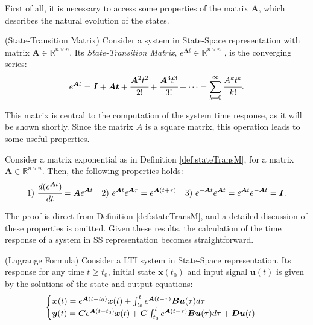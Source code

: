 \documentclass[a4paper,11pt]{book}
\numberwithin{figure}{chapter}
\numberwithin{equation}{chapter}
\numberwithin{table}{chapter}
\newtheorem{theorem}{Theorem}[chapter]
\theoremstyle{definition}
\newtheorem{definition}{Definition}[chapter]
\newcounter{boxed-theorem}
\newenvironment{boxed-theorem}[1]
{\begin{shaded} \begin{theorem}{#1}}
{\end{theorem} \end{shaded}}
\newcounter{boxed-definition}
\newenvironment{boxed-definition}[1]
{\begin{shaded} \begin{definition}{#1}}
{\end{definition} \end{shaded}}
\begin{document}
First of all, it is necessary to access some properties of the matrix $\bm{A}$, which describes the natural evolution of the states. 

\begin{boxed-definition}{(State-Transition Matrix)} \label{def:stateTransM}
    Consider a system in State-Space representation with matrix $\bm{A} \in \mathbb{R}^{n \times n}$. Its \textit{State-Transition Matrix}, $e^{\bm{A} t} \in \mathbb{R}^{n \times n}$ , is the converging series:
\begin{equation}
    e^{\bm{A} t} = \bm{I} + \bm{At} + \cfrac{\bm{A}^2 t^2}{2!} + \cfrac{\bm{A}^3 t^3}{3!} + \cdots = \sum_{k=0}^{\infty} \cfrac{A^k t^k}{k!}
.\end{equation} 
\end{boxed-definition}

This matrix is central to the computation of the system time response, as it will be shown shortly. Since the matrix $A$ is a square matrix, this operation leads to some useful properties.

\begin{boxed-theorem}{} \label{th:stateTransMProp}
    Consider a matrix exponential as in Definition \ref{def:stateTransM}, for a matrix $\bm{A}  \in \mathbb{R}^{n \times n}$. Then, the following properties holds:
\begin{align}
        1)\ \cfrac{d ( e^{\bm{A} t} )}{dt} = \bm{A} e^{\bm{A} t} & &
        2)\ e^{\bm{A} t} e^{\bm{A} \tau} = e^{\bm{A} (t + \tau)} & &
        3)\ e^{-\bm{A} t} e^{\bm{A} t} = e^{\bm{A} t} e^{-\bm{A} t} = \bm{I}
.\end{align}
\end{boxed-theorem}

The proof is direct from Definition \ref{def:stateTransM}, and a detailed discussion of these properties is omitted. Given these results, the calculation of the time response of a system in SS representation becomes straightforward.

\begin{boxed-theorem}{(Lagrange Formula)} \label{th:lagrangeForm}
    Consider a LTI system in State-Space representation. Its response for any time $t \geq t_0$, initial state $\bm{x}(t_0)$ and input signal $\bm{u}(t)$ is given by the solutions of the state and output equations:
    \begin{align}
    \begin{cases}
        \bm{x}(t) = e^{\bm{A}(t - t_0)} \bm{x}(t) + \int_{t_0}^{t} e^{\bm{A}(t - \tau)} \bm{B} \bm{u}(\tau) d \tau \hfill & \\
        \bm{y}(t) = \bm{C} e^{\bm{A}(t - t_0)} \bm{x}(t) + \bm{C} \int_{t_0}^{t} e^{\bm{A}(t - \tau)} \bm{B} \bm{u}(\tau) d \tau + \bm{D} \bm{u}(t) &
    \end{cases}
    .\end{align}
\end{boxed-theorem}
\end{document}
